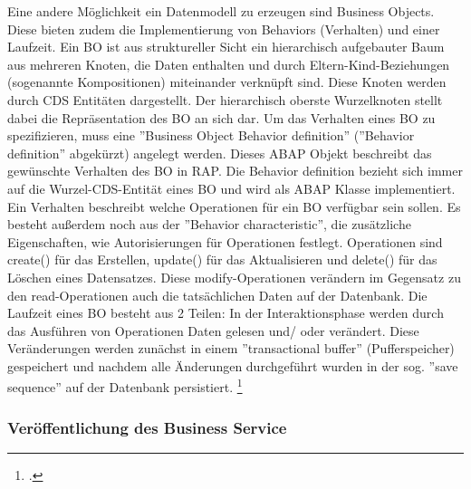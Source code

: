 Eine andere Möglichkeit ein Datenmodell zu erzeugen sind Business Objects. Diese bieten zudem die Implementierung von Behaviors (Verhalten) und einer Laufzeit. Ein BO ist aus struktureller Sicht ein hierarchisch aufgebauter Baum aus mehreren Knoten, die Daten enthalten und durch Eltern-Kind-Beziehungen (sogenannte Kompositionen) miteinander verknüpft sind. Diese Knoten werden durch CDS Entitäten dargestellt. Der hierarchisch oberste Wurzelknoten stellt dabei die Repräsentation des BO an sich dar. Um das Verhalten eines BO zu spezifizieren, muss eine ''Business Object Behavior definition'' (''Behavior definition'' abgekürzt) angelegt werden. Dieses ABAP Objekt beschreibt das gewünschte Verhalten des BO in RAP. Die Behavior definition bezieht sich immer auf die Wurzel-CDS-Entität eines BO und wird als ABAP Klasse implementiert. Ein Verhalten beschreibt welche Operationen für ein BO verfügbar sein sollen. Es besteht au{\ss}erdem noch aus der ''Behavior characteristic'', die zusätzliche Eigenschaften, wie \zB Autorisierungen für Operationen festlegt. Operationen sind \zB create() für das Erstellen, update() für das Aktualisieren und delete() für das Löschen eines Datensatzes. Diese modify-Operationen verändern im Gegensatz zu den read-Operationen auch die tatsächlichen Daten auf der Datenbank. Die Laufzeit eines BO besteht aus 2 Teilen: In der Interaktionsphase werden durch das Ausführen von Operationen Daten gelesen und/ oder verändert. Diese Veränderungen werden zunächst in einem ''transactional buffer'' (Pufferspeicher) gespeichert und nachdem alle Änderungen durchgeführt wurden in der sog. ''save sequence'' auf der Datenbank persistiert. \footcite[Vgl.][]{sap_rap_2023}

\subsubsection{Veröffentlichung des Business Service}

